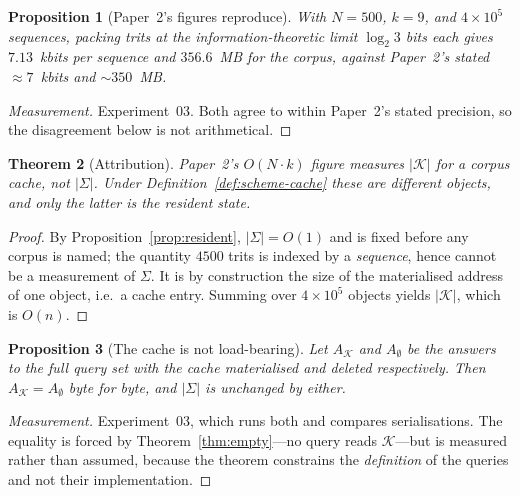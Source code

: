 \documentclass[11pt,twocolumn,a4paper]{article}
\newcommand{\Sch}{\Sigma}
\newcommand{\Cache}{\mathcal{K}}
\theoremstyle{plain}
\newtheorem{theorem}{Theorem}
\newtheorem{proposition}[theorem]{Proposition}
\theoremstyle{definition}
\theoremstyle{remark}
\begin{document}
\begin{proposition}[Paper~2's figures reproduce]
\label{prop:p2-arith}
With $N = 500$, $k = 9$, and $4 \times 10^{5}$ sequences, packing trits at
the information-theoretic limit $\log_{2} 3$ bits each gives $7.13$~kbits
per sequence and $356.6$~MB for the corpus, against Paper~2's stated
${\approx}7$~kbits and ${\sim}350$~MB.
\end{proposition}

\begin{proof}[Measurement]
Experiment~03. Both agree to within Paper~2's stated precision, so the
disagreement below is not arithmetical.
\end{proof}

\begin{theorem}[Attribution]
\label{thm:attribution}
Paper~2's $O(N \cdot k)$ figure measures $|\Cache|$ for a corpus cache, not
$|\Sch|$. Under Definition~\ref{def:scheme-cache} these are different
objects, and only the latter is the resident state.
\end{theorem}

\begin{proof}
By Proposition~\ref{prop:resident}, $|\Sch| = O(1)$ and is fixed before any
corpus is named; the quantity $4500$ trits is indexed by a \emph{sequence},
hence cannot be a measurement of $\Sch$. It is by construction the size of
the materialised address of one object, i.e.\ a cache entry. Summing over
$4 \times 10^{5}$ objects yields $|\Cache|$, which is $O(n)$.
\end{proof}

\begin{proposition}[The cache is not load-bearing]
\label{prop:cache-optional}
Let $A_{\Cache}$ and $A_{\emptyset}$ be the answers to the full query set
with the cache materialised and deleted respectively. Then
$A_{\Cache} = A_{\emptyset}$ byte for byte, and $|\Sch|$ is unchanged by
either.
\end{proposition}

\begin{proof}[Measurement]
Experiment~03, which runs both and compares serialisations. The equality is
forced by Theorem~\ref{thm:empty}---no query reads $\Cache$---but is
measured rather than assumed, because the theorem constrains the
\emph{definition} of the queries and not their implementation.
\end{proof}
\end{document}
